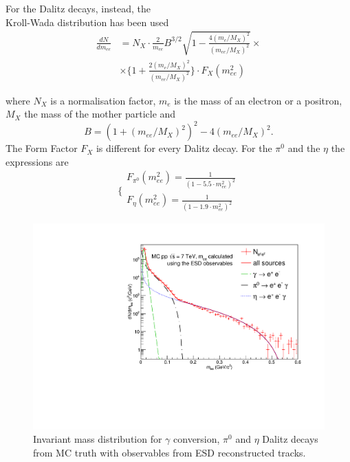 \documentclass[a4paper,twocolumn,gsifonts,twoside]{gsipaper}
\begin{document}
For the Dalitz decays, instead, the \\Kroll-Wada distribution has been used
\begin{equation}
\begin{split}
\frac{dN}{dm_{ee}} &=N_{X}\cdot\frac{2}{m_{ee}}B^{3/2}\sqrt{1-\frac{4(m_{e}/M_{X})^{2}}{(m_{ee}/M_{X})^{2}}}\times \\
&\times \Bigg\{1+\frac{2(m_{e}/M_{X})^{2}}{(m_{ee}/M_{X})^{2}}\Bigg\}\cdot F_{X}(m_{ee}^2) 
\label{kroll_wada}
\end{split}
\end{equation}

where $N_{X}$ is a normalisation factor, $m_{e}$ is the mass of an electron or a positron, $M_{X}$ the mass of the mother particle 
and 
\begin{equation}
B=(1+(m_{ee}/M_{X})^{2})^2-4(m_{ee}/M_{X})^{2}.
\label{kroll_wada}
\end{equation}
The Form Factor $F_{X}$ is different for every Dalitz decay. For the $\pi^{0}$ and the $\eta$ the expressions are 
\begin{equation}
\Bigg\{
\begin{array}{rl}
F_{\pi^{0}}(m_{ee}^2) = \frac{1}{(1-5.5\cdot m_{ee}^2)^{2}}\\
F_{\eta}(m_{ee}^2) = \frac{1}{(1-1.9\cdot m_{ee}^2)^{2}}
\label{formfactors}
\end{array}
\end{equation}

\begin{figure}[tb]
\center
\includegraphics[scale = 0.4]{Inv_mass_ESD.pdf}
\caption{Invariant mass distribution for $\gamma$ conversion, $\pi^{0}$ and $\eta$ Dalitz decays from MC truth with 
observables from ESD reconstructed tracks.}
\label{ESDdist}
\end{figure}
\end{document}
